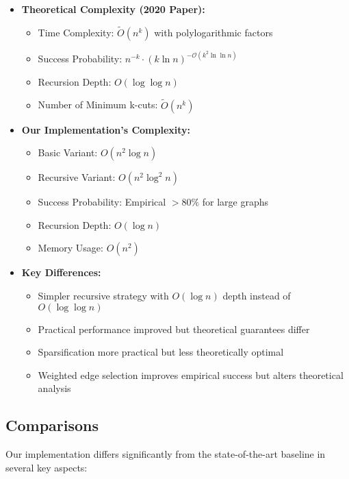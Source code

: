 \documentclass[11pt]{article}
\begin{document}
\begin{itemize}
    \item \textbf{Theoretical Complexity (2020 Paper):}
    \begin{itemize}
        \item Time Complexity: \( \tilde{O}(n^k) \) with polylogarithmic factors
        \item Success Probability: \( n^{-k} \cdot (k \ln n)^{-\mathcal{O}(k^2 \ln \ln n)} \)
        \item Recursion Depth: \( O(\log \log n) \)
        \item Number of Minimum k-cuts: \( \tilde{O}(n^k) \)
    \end{itemize}

    \item \textbf{Our Implementation's Complexity:}
    \begin{itemize}
        \item Basic Variant: \( O(n^2 \log n) \)
        \item Recursive Variant: \( O(n^2 \log^2 n) \)
        \item Success Probability: Empirical \( >80\% \) for large graphs
        \item Recursion Depth: \( O(\log n) \)
        \item Memory Usage: \( O(n^2) \)
    \end{itemize}

    \item \textbf{Key Differences:}
    \begin{itemize}
        \item Simpler recursive strategy with \( O(\log n) \) depth instead of \( O(\log \log n) \)
        \item Practical performance improved but theoretical guarantees differ
        \item Sparsification more practical but less theoretically optimal
        \item Weighted edge selection improves empirical success but alters theoretical analysis
    \end{itemize}
\end{itemize}

\subsection{Comparisons}

Our implementation differs significantly from the state-of-the-art baseline in several key aspects:
\end{document}
